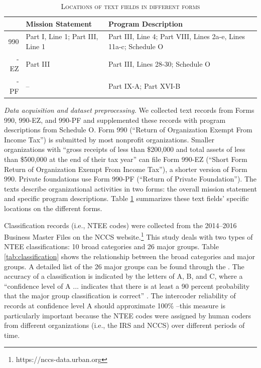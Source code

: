 \documentclass[11pt]{article}
\begin{document}
\begin{table}[]
    \centering
    \begin{tabularx}{0.8\textwidth}{r|X|X}
    	 \hline
         & Mission Statement & Program Description \\
         \hline
         990 & Part I, Line 1; Part III, Line 1 & Part III, Line 4; Part VIII, Lines 2a-e, Lines 11a-c; Schedule O \\
         \hdashline
         990-EZ & Part III & Part III, Lines 28-30; Schedule O \\
         \hdashline
         990-PF & -- & Part IX-A; Part XVI-B \\
         \hline
    \end{tabularx}
    \caption{\textsc{Locations of text fields in different forms}} \label{tab:text_loc}
\end{table}

\textit{Data acquisition and dataset preprocessing.} We collected text records from Forms 990, 990-EZ, and 990-PF and supplemented these records with program descriptions from Schedule O. Form 990 (``Return of Organization Exempt From Income Tax'') is submitted by most nonprofit organizations. Smaller organizations with ``gross receipts of less than \$200,000 and total assets of less than \$500,000 at the end of their tax year'' \parencite[1]{USInternalRevenueService2017InstructionsForm2018} can file Form 990-EZ (``Short Form Return of Organization Exempt From Income Tax''), a shorter version of Form 990. Private foundations use Form 990-PF (``Return of Private Foundation''). The texts describe organizational activities in two forms: the overall mission statement and specific program descriptions. Table \ref{tab:text_loc} summarizes these text fields' specific locations on the different forms.

Classification records (i.e., NTEE codes) were collected from the 2014--2016 Business Master Files on the NCCS website.\footnote{https://nccs-data.urban.org} This study deals with two types of NTEE classifications: 10 broad categories and 26 major groups. Table \ref{tab:classification} shows the relationship between the broad categories and major groups. A detailed list of the 26 major groups can be found through the \textcite{USInternalRevenueServiceExemptOrganizationsBusiness2014}. The accuracy of a classification is indicated by the letters of A, B, and C, where a ``confidence level of A ... indicates that there is at least a 90 percent probability that the major group classification is correct'' \parencite[16]{NationalCenterforCharitableStatisticsGuideUsingNCCS2006}. The intercoder reliability of records at confidence level A should approximate 100\% \parencite[147]{StengelGettingItRight1998}--this measure is particularly important because the NTEE codes were assigned by human coders from different organizations (i.e., the IRS and NCCS) over different periods of time.
\end{document}
